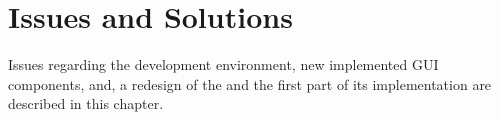 
\chapter{Issues and Solutions}
Issues regarding the development environment, new implemented GUI components, and, a redesign of the \ct and the first part of its implementation are described in this chapter.








